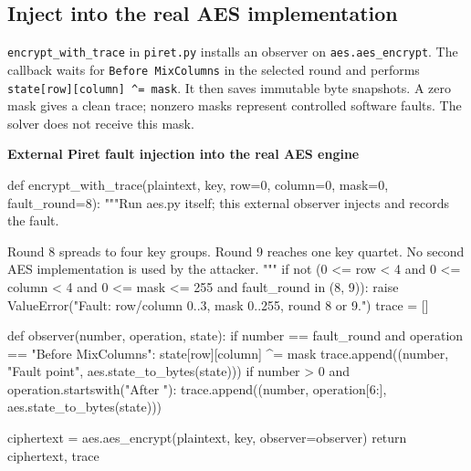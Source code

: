 \subsection{Inject into the real AES implementation}
\texttt{encrypt\_\allowbreak{}with\_\allowbreak{}trace} in \texttt{piret.py} installs an observer on \texttt{aes.aes\_\allowbreak{}encrypt}. The callback waits for \texttt{Before MixColumns} in the selected round and performs \texttt{state[row][column] \textasciicircum{}= mask}. It then saves immutable byte snapshots. A zero mask gives a clean trace; nonzero masks represent controlled software faults. The solver does not receive this mask.
\par\smallskip\noindent\textbf{External Piret fault injection into the real AES engine}\par
\begin{lightcode}
def encrypt_with_trace(plaintext, key, row=0, column=0, mask=0, fault_round=8):
    """Run aes.py itself; this external observer injects and records the fault.

    Round 8 spreads to four key groups. Round 9 reaches one key quartet.
    No second AES implementation is used by the attacker.
    """
    if not (0 <= row < 4 and 0 <= column < 4 and 0 <= mask <= 255 and fault_round in (8, 9)):
        raise ValueError("Fault: row/column 0..3, mask 0..255, round 8 or 9.")
    trace = []

    def observer(number, operation, state):
        if number == fault_round and operation == "Before MixColumns":
            state[row][column] ^= mask
            trace.append((number, "Fault point", aes.state_to_bytes(state)))
        if number > 0 and operation.startswith("After "):
            trace.append((number, operation[6:], aes.state_to_bytes(state)))

    ciphertext = aes.aes_encrypt(plaintext, key, observer=observer)
    return ciphertext, trace
\end{lightcode}

